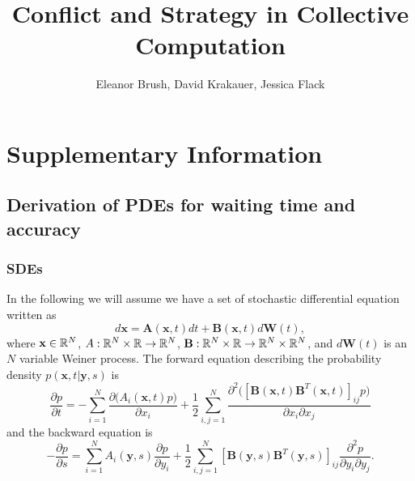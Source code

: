 \documentclass{article}
\title{Conflict and Strategy in Collective Computation}
\author{Eleanor Brush, David Krakauer, Jessica Flack}
\newcommand{\mb}{\mathbf}
\begin{document}
\maketitle
\tableofcontents

\section*{Supplementary Information}
\renewcommand{\thesubsection}{\Alph{subsection}.}
\renewcommand{\thesubsubsection}{\thesubsection \arabic{subsubsection}}
\renewcommand{\thetheorem}{\arabic{theorem}}

\subsection{Derivation of PDEs for waiting time and accuracy \label{pdes_deriv}}
\subsubsection{SDEs }
In the following we will assume we have a set of stochastic differential equation written as
\begin{equation}
d{\mathbf x} ={\mb A}({\mb x},t)dt+{\mb B}({\mb x},t)d{\mb W}(t), \label{sde}
\end{equation}
where ${\mb x}\in\R^N$, $A:{\mathbb{R}}^N\times {\mathbb{R}}\to{\mathbb{R}}^N$, ${\mb B}:\R^N\times\R\to\R^N\times\R^N$, and $d{\mb W}(t)$ is an $N$ variable Weiner process. The forward equation describing the probability density $p({\mb x},t|{\mb y},s)$ is 
\begin{equation}
\frac{\partial p}{\partial t} =-\sum_{i=1}^N\frac{\partial \big(A_i({\mb x},t)p\big)}{\partial x_i}+\frac{1}{2}\sum_{i,j=1}^N\frac{\partial^2\big([{\mb B}({\mb x},t){\mb B}^T({\mb x},t)]_{ij}p\big)}{\partial x_i\partial x_j} \label{forward}
\end{equation}
and the backward equation is 
\begin{equation}
-\frac{\partial p}{\partial s}=\sum_{i=1}^NA_i({\mb y},s)\frac{\partial p}{\partial y_i}+\frac{1}{2}\sum_{i,j=1}^N[{\mb B}({\mb y},s){\mb B}^T({\mb y},s)]_{ij}\frac{\partial^2 p}{\partial y_i\partial y_j}. \label{backward}
\end{equation}
\end{document}
